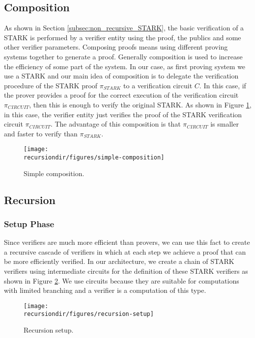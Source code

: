 \subsection{Composition}

As shown in Section \ref{subsec:non_recursive_STARK}, the basic verification of a STARK is performed by a verifier entity using the proof, the publics and some other verifier parameters.
Composing proofs means using different proving systems together to generate a proof.
Generally composition is used to increase the efficiency of some part of the system.
In our case, as first proving system we use a STARK and our main idea of composition is to delegate the verification procedure of the STARK proof $\pi_{STARK}$ to a verification circuit $C$.
In this case, if the prover provides a proof for the correct execution of the verification circuit $\pi_{CIRCUIT}$, then this is enough to verify the original STARK.
As shown in Figure \ref{fig:simple-composition}, in this case, 
the verifier entity just verifies the proof of the STARK verification circuit $\pi_{CIRCUIT}$.
The advantage of this composition is that $\pi_{CIRCUIT}$ is smaller and faster to verify than $\pi_{STARK}$.

\begin{figure}[H]
\centering
\texttt{[image: \\recursiondir/figures/simple-composition]}
\caption{Simple composition.}
\label{fig:simple-composition}
\end{figure}

\subsection{Recursion}

\subsubsection{Setup Phase}

Since verifiers are much more efficient than provers, we can use this fact to create a recursive cascade of verifiers in which at each step we achieve a proof that can be more efficiently verified.
In our architecture, we create a chain of STARK verifiers using intermediate circuits for the definition of these STARK verifiers as shown in Figure \ref{fig:recursion-setup}.
We use circuits because they are suitable for computations with limited branching and a verifier is a computation of this type.

\begin{figure}[H]
\centering
\texttt{[image: \\recursiondir/figures/recursion-setup]}
\caption{Recursion setup.}
\label{fig:recursion-setup}
\end{figure}

